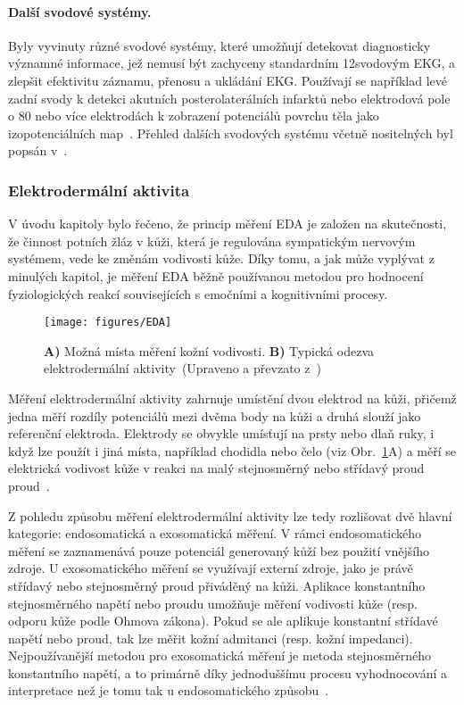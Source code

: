 \paragraph{Další svodové systémy.}
Byly vyvinuty různé svodové systémy, které umožňují detekovat diagnosticky
významné informace, jež nemusí být zachyceny standardním 12svodovým EKG, a
zlepšit efektivitu záznamu, přenosu a ukládání EKG. Používají se například levé
zadní svody k detekci akutních posterolaterálních infarktů nebo elektrodová pole
o 80 nebo více elektrodách k zobrazení potenciálů povrchu těla jako izopotenciálních
map~\cite{Goldberger2017,mirvis2001}. Přehled dalších svodových systému včetně
nositelných byl popsán v~\cite{Baig2013,Majumder2018,Serhani2020}.

\subsubsection{Elektrodermální aktivita}
V úvodu kapitoly bylo řečeno, že princip měření EDA je založen na skutečnosti,
že činnost potních žláz v kůži, která je regulována sympatickým nervovým
systémem, vede ke změnám vodivosti kůže. Díky tomu, a jak může vyplývat z
minulých kapitol, je měření EDA běžně používanou metodou pro hodnocení
fyziologických reakcí souvisejících s emočními a kognitivními procesy.

\begin{figure}[htb!]
    \begin{center}
        \texttt{[image: figures/EDA]}
        \caption{\textbf{A)} Možná místa měření kožní vodivosti. \textbf{B)}
            Typická odezva elektrodermální aktivity~(Upraveno a převzato
            z~\cite{Janssen2012,Vavrinsky2021})}
        \label{fig:eda_mereni}
    \end{center}
\end{figure}

Měření elektrodermální aktivity zahrnuje umístění dvou elektrod na kůži, přičemž
jedna měří rozdíly potenciálů mezi dvěma body na kůži a druhá slouží jako
referenční elektroda. Elektrody se obvykle umísťují na prsty nebo dlaň ruky, i
když lze použít i jiná místa, například chodidla nebo čelo (viz
Obr.~\ref{fig:eda_mereni}A) a měří se elektrická vodivost kůže v reakci na malý
stejnosměrný nebo střídavý proud proud~\cite{Caruelle2019,Boucsein2012}.

Z pohledu způsobu měření elektrodermální aktivity lze tedy rozlišovat dvě hlavní
kategorie: endosomatická a exosomatická měření. V rámci endosomatického měření
se zaznamenává pouze potenciál generovaný kůží bez použití vnějšího zdroje. U
exosomatického měření se využívají externí zdroje, jako je právě střídavý nebo
stejnosměrný proud přiváděný na kůži. Aplikace konstantního stejnosměrného
napětí nebo proudu umožňuje měření vodivosti kůže (resp. odporu kůže podle
Ohmova zákona). Pokud se ale aplikuje konstantní střídavé napětí nebo proud, tak
lze měřit kožní admitanci (resp. kožní impedanci). Nejpoužívanější metodou pro
exosomatická měření je metoda stejnosměrného konstantního napětí, a to primárně
díky jednoduššímu procesu vyhodnocování a interpretace než je tomu tak u
endosomatického způsobu~\cite{Boucsein2012,Li2022,Posada2020,Caruelle2019}.

